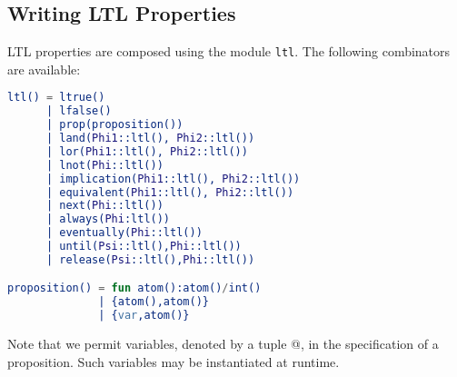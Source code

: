 \documentclass[a4paper]{article}
\begin{document}
\subsection{Writing LTL Properties}
\label{module_ltl}
LTL properties are composed using the module \lstinline{ltl}.
The following combinators are available:
\begin{lstlisting}[language=Erlang]
ltl() = ltrue() 
      | lfalse()  
      | prop(proposition()) 
      | land(Phi1::ltl(), Phi2::ltl()) 
      | lor(Phi1::ltl(), Phi2::ltl()) 
      | lnot(Phi::ltl()) 
      | implication(Phi1::ltl(), Phi2::ltl()) 
      | equivalent(Phi1::ltl(), Phi2::ltl()) 
      | next(Phi::ltl()) 
      | always(Phi:ltl()) 
      | eventually(Phi::ltl()) 
      | until(Psi::ltl(),Phi::ltl()) 
      | release(Psi::ltl(),Phi::ltl()) 

proposition() = fun atom():atom()/int()
              | {atom(),atom()}
              | {var,atom()}
\end{lstlisting}

Note that we permit variables, denoted by a tuple @,
in the specification of a proposition. Such variables may be instantiated
at runtime.
\end{document}
